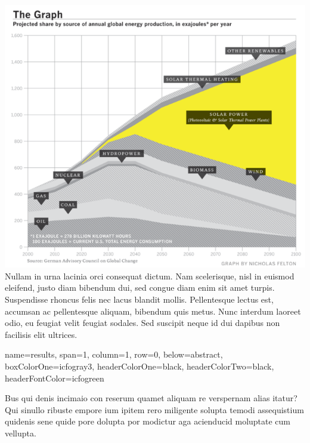 \documentclass[a0paper,portrait]{baposter}
\begin{document}
\begin{poster}
{\vspace{3mm}
\hspace{1.5mm}
\begin{minipage}{0.95\textwidth}
\begin{multicols}{2}
\includegraphics[width=0.95\columnwidth]{sample-graph.png}
\vfill\null
\columnbreak
\footnotesize
Nullam in urna lacinia orci consequat dictum. Nam scelerisque, nisl in euismod eleifend, justo diam bibendum dui, sed congue diam enim sit amet turpis. Suspendisse rhoncus felis nec lacus blandit mollis. Pellentesque lectus est, accumsan ac pellentesque aliquam, bibendum quis metus. Nunc interdum laoreet odio, eu feugiat velit feugiat sodales. Sed suscipit neque id dui dapibus non facilisis elit ultrices.
\vfill\null
\end{multicols}
\end{minipage}
}


{name=results, span=1, column=1, row=0, below=abstract, boxColorOne=icfogray3, headerColorOne=black, headerColorTwo=black, headerFontColor=icfogreen}{
\setlength{\parskip}{0.5em}

\begin{multicols}{2}

\small
\color{white}

Bus qui denis incimaio con reserum quamet aliquam re verspernam alias itatur? Qui sinullo ribuste empore ium ipitem rero miligente solupta temodi assequistium quidenis sene quide pore dolupta por modictur aga acienducid moluptate cum vellupta.


\end{multicols}}
\end{poster}
\end{document}
